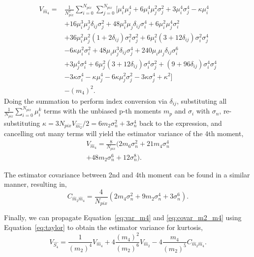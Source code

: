 \documentclass[fleqn,usenatbib]{mnras}
\begin{document}
\begin{align}
    V_{\hat{m}_4} = &\frac{1}{N_{pix}^2}
        \sum_{i=0}^{N_{pix}}\sum_{j=0}^{N_{pix}}
        \Big\lbrack\mu_i^4\mu_j^4 
        + 6\mu_i^4\mu_j^2\sigma_j^2 
        + 3\mu_i^4\sigma_j^4 
        - \kappa\mu_i^4 \nonumber\\
        &+ 16\mu_i^3\mu_j^3\delta_{ij}\sigma_j^2 
        + 48\mu_i^3\mu_j\delta_{ij}\sigma_i^4
        + 6\mu_i^2\mu_j^4\sigma_i^2 \nonumber\\ 
        &+ 36\mu_i^2\mu_j^2(1+2\delta_{ij})\sigma_i^2\sigma_j^2 
        + 6\mu_i^2(3+12\delta_{ij})\sigma_i^2\sigma_j^4
        \nonumber\\
        &- 6\kappa\mu_i^2\sigma_i^2 
        + 48\mu_i\mu_j^3\delta_{ij}\sigma_j^4
        + 240\mu_i\mu_j\delta_{ij}\sigma_i^6 \nonumber\\ 
        &+ 3\mu_j^4\sigma_i^4 
        + 6\mu_j^2(3+12\delta_{ij})\sigma_i^4\sigma_j^2 
        + (9+96\delta_{ij})\sigma_i^4\sigma_j^4 \nonumber\\
        &- 3\kappa\sigma_i^4
        - \kappa\mu_j^4
        - 6\kappa\mu_j^2\sigma_j^2
        - 3\kappa\sigma_j^4 
        + \kappa^2 \Big\rbrack \nonumber \\
        &- (m_4)^2.
\end{align}
Doing the summation to perform index conversion via $\delta_{ij}$, substituting all $\frac{1}{N_{pix}}\sum_{i=0}^{N_{pix}}\mu_i^k$ terms with the unbiased p-th moments $m_p$ and $\sigma_i$ with $\sigma_n$, re-substituting $\kappa = 3N_{pix}V_{\hat{m_2}}/2 = 6 m_2 \sigma_n^2 + 3 \sigma_n^4$ back to the expression, and cancelling out many terms will yield the estimator variance of the 4th moment,
\begin{equation}
\begin{split}
    V_{\hat{m}_4} = \frac{8}{N_{pix}}
    (2 m_6 \sigma_n^2 + 21 m_4 \sigma_n^4 \\
    + 48 m_2 \sigma_n^6 + 12 \sigma_n^8).
    \label{eq:var_m4}
\end{split}
\end{equation}

The estimator covariance between 2nd and 4th moment can be found in a similar manner, resulting in,
\begin{equation}
    C_{\hat{m}_2\hat{m}_4} = \frac{4}{N_{pix}}
        (2 m_4 \sigma_n^2 + 9 m_2 \sigma_n^4
        + 3 \sigma_n^6).
    \label{eq:covar_m2_m4}
\end{equation}

Finally, we can propagate Equation~\ref{eq:var_m4} and \ref{eq:covar_m2_m4} using Equation~\ref{eq:taylor} to obtain the estimator variance for kurtosis,
\begin{equation}
    V_{\hat{S_4}} = \frac{1}{(m_2)^4} V_{\hat{m}_4}
    + 4 \frac{(m_4)^2}{(m_2)^6} V_{\hat{m}_2} - 4 \frac{m_4}{(m_2)^5} C_{\hat{m}_2\hat{m}_4}.
\end{equation}
\end{document}
